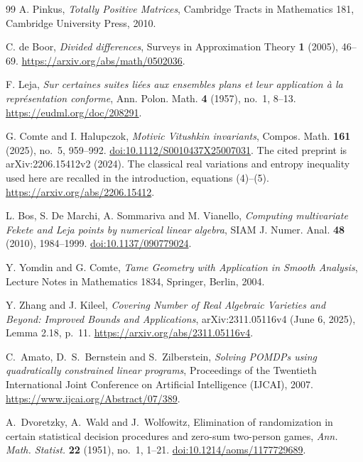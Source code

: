 \begin{thebibliography}{99}
A. Pinkus, \emph{Totally Positive Matrices}, Cambridge Tracts in
Mathematics 181, Cambridge University Press, 2010.

C. de Boor, \emph{Divided differences}, Surveys in Approximation Theory
\textbf{1} (2005), 46--69. \url{https://arxiv.org/abs/math/0502036}.

F. Leja, \emph{Sur certaines suites li\'ees aux ensembles plans et leur
application \`a la repr\'esentation conforme}, Ann. Polon. Math.
\textbf{4} (1957), no.~1, 8--13.
\url{https://eudml.org/doc/208291}.

G. Comte and I. Halupczok, \emph{Motivic Vitushkin invariants},
Compos. Math. \textbf{161} (2025), no.~5, 959--992.
\href{https://doi.org/10.1112/S0010437X25007031}{doi:10.1112/S0010437X25007031}.
The cited preprint is arXiv:2206.15412v2 (2024). The classical real variations and entropy
inequality used here are recalled in the introduction, equations (4)--(5).
\url{https://arxiv.org/abs/2206.15412}.

L. Bos, S. De Marchi, A. Sommariva and M. Vianello,
\emph{Computing multivariate Fekete and Leja points by numerical linear
algebra}, SIAM J. Numer. Anal. \textbf{48} (2010), 1984--1999.
\href{https://doi.org/10.1137/090779024}{doi:10.1137/090779024}.

Y. Yomdin and G. Comte, \emph{Tame Geometry with Application in Smooth
Analysis}, Lecture Notes in Mathematics 1834, Springer, Berlin, 2004.

Y. Zhang and J. Kileel, \emph{Covering Number of Real Algebraic Varieties
and Beyond: Improved Bounds and Applications}, arXiv:2311.05116v4 (June 6, 2025),
Lemma 2.18, p.~11. \url{https://arxiv.org/abs/2311.05116v4}.

C.~Amato, D.~S.~Bernstein and S.~Zilberstein,
\emph{Solving POMDPs using quadratically constrained linear programs},
Proceedings of the Twentieth International Joint Conference on
Artificial Intelligence (IJCAI), 2007.
\url{https://www.ijcai.org/Abstract/07/389}.

A.~Dvoretzky, A.~Wald and J.~Wolfowitz, Elimination of randomization in
certain statistical decision procedures and zero-sum two-person games,
\emph{Ann. Math. Statist.} \textbf{22} (1951), no.~1, 1--21.
\href{https://doi.org/10.1214/aoms/1177729689}{doi:10.1214/aoms/1177729689}.


\end{thebibliography}
